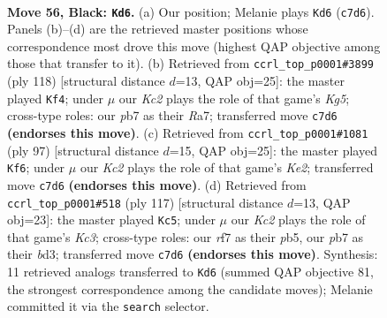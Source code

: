 \documentclass[11pt]{article}
\begin{document}
\clearpage

\begin{figure}[p]\centering
\begin{subfigure}{0.46\textwidth}\centering
\resizebox{\linewidth}{!}{%
\newchessgame
\chessboard[
  setfen={8/1Pk2R2/8/3B4/8/4K3/8/8 b - - 0 56},
  showmover=false,
  pgfstyle=straightmove, color=movearrow, markmove={c7-d6}
]}
\caption{}
\end{subfigure}\hfill
\begin{subfigure}{0.46\textwidth}\centering
\resizebox{\linewidth}{!}{%
\newchessgame
\chessboard[
  setfen={4b3/R7/3k4/6Kr/8/5P2/8/8 w - - 2 60},
  showmover=false,
  pgfstyle=straightmove, color=movearrow, markmove={g5-f4}
]}
\caption{}
\end{subfigure}
\\[4pt]
\begin{subfigure}{0.46\textwidth}\centering
\resizebox{\linewidth}{!}{%
\newchessgame
\chessboard[
  setfen={8/3Rk3/8/4b3/1r4B1/7P/5K2/8 b - - 8 49},
  showmover=false,
  pgfstyle=straightmove, color=movearrow, markmove={e7-f6}
]}
\caption{}
\end{subfigure}\hfill
\begin{subfigure}{0.46\textwidth}\centering
\resizebox{\linewidth}{!}{%
\newchessgame
\chessboard[
  setfen={8/4b3/2k5/KP6/3p4/3B4/8/8 b - - 0 59},
  showmover=false,
  pgfstyle=straightmove, color=movearrow, markmove={c6-c5}
]}
\caption{}
\end{subfigure}
\caption{\textbf{Move 56, Black: \texttt{Kd6}.} (a) Our position; Melanie plays \texttt{Kd6} (\texttt{c7d6}). Panels (b)--(d) are the retrieved master positions whose correspondence most drove this move (highest QAP objective among those that transfer to it). (b) Retrieved from \texttt{ccrl\_top\_p0001\#3899} (ply 118) [structural distance $d$=13, QAP obj=25]: the master played \texttt{Kf4}; under $\mu$ our \emph{Kc2} plays the role of that game's \emph{Kg5}; cross-type roles: our \emph{p}b7 as their \emph{R}a7; transferred move \texttt{c7d6} \textbf{(endorses this move)}. (c) Retrieved from \texttt{ccrl\_top\_p0001\#1081} (ply 97) [structural distance $d$=15, QAP obj=25]: the master played \texttt{Kf6}; under $\mu$ our \emph{Kc2} plays the role of that game's \emph{Ke2}; transferred move \texttt{c7d6} \textbf{(endorses this move)}. (d) Retrieved from \texttt{ccrl\_top\_p0001\#518} (ply 117) [structural distance $d$=13, QAP obj=23]: the master played \texttt{Kc5}; under $\mu$ our \emph{Kc2} plays the role of that game's \emph{Kc3}; cross-type roles: our \emph{r}f7 as their \emph{p}b5, our \emph{p}b7 as their \emph{b}d3; transferred move \texttt{c7d6} \textbf{(endorses this move)}. Synthesis: 11 retrieved analogs transferred to \texttt{Kd6} (summed QAP objective 81, the strongest correspondence among the candidate moves); Melanie committed it via the \texttt{search} selector.}
\label{fig:thought-m111}
\end{figure}
\end{document}
